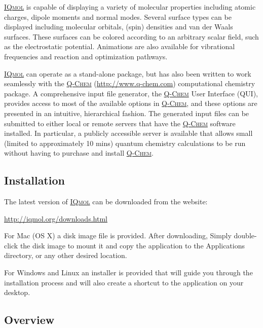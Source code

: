 \documentclass[a4paper,12pt]{article}
\newcommand{\qchem}{\href{http://q-chem.com}{{\scshape Q-Chem}}}
\newcommand{\iqmol}{\href{http://iqmol.org}{{\scshape IQmol}}}
\begin{document}
\iqmol{} is capable of displaying a variety of molecular properties including
atomic charges, dipole moments and normal modes.  Several surface types can be
displayed including molecular orbitals, (spin) densities and van der Waals
surfaces. These surfaces can be colored according to an arbitrary scalar field,
such as the electrostatic potential.  Animations are also available for
vibrational frequencies and reaction and optimization pathways.

\iqmol{} can operate as a stand-alone package, but has also been written to
work seamlessly with the \qchem{} (\url{http://www.q-chem.com}) computational
chemistry package.  A comprehensive input file generator, the \qchem{} User
Interface (QUI), provides access to most of the available options in \qchem{},
and these options are presented in an intuitive, hierarchical fashion.   The
generated input files can be submitted to either local or remote servers that
have the \qchem{} software installed.  In particular, a publicly accessible
server is available that allows small (limited to approximately 10 mins)
quantum chemistry calculations to be run without having to purchase and install
\qchem{}.



\subsection{Installation}

The latest version of \iqmol{} can be downloaded from the website:
\begin{center}
\url{http://iqmol.org/downloads.html}
\end{center}

For Mac (OS X) a disk image file is provided.  After downloading, Simply
double-click the disk image to mount it and copy the application to the
Applications directory, or any other desired location.

For Windows and Linux an installer is provided that will guide you through the
installation process and will also create a shortcut to the application on your
desktop.

\newpage
\subsection{Overview}
\label{sec:overview}
\end{document}
